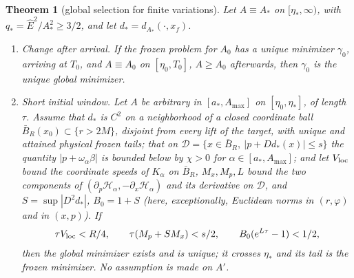 \documentclass[aip,jmp,amsmath,amssymb,reprint]{revtex4-2}
\newcommand{\Ehat}{\hat E}
\theoremstyle{plain}
\newtheorem{theorem}{Theorem}
\theoremstyle{definition}
\begin{document}
\begin{theorem}[global selection for finite variations]\label{thm:tau-eq-select}
Let $A\equiv A_*$ on $[\eta_*,\infty)$, with $q_*=\Ehat^2/A_*^2\ge3/2$, and let $d_*=d_{A_*}(\cdot,x_f)$.
\begin{enumerate}
\item \emph{Change after arrival.} If the frozen problem for $A_0$ has a unique minimizer $\gamma_0$,
  arriving at $T_0$, and $A\equiv A_0$ on $[\eta_0,T_0]$, $A\ge A_0$ afterwards, then $\gamma_0$ is the unique
  global minimizer.
\item \emph{Short initial window.} Let $A$ be arbitrary in $[a_*,A_{\max}]$ on $[\eta_0,\eta_*]$, of
  length $\tau$. Assume that $d_*$ is $C^2$ on a neighborhood of a closed coordinate ball
  $\bar B_R(x_0)\subset\{r>2M\}$, disjoint from every lift of the target, with unique and attained
  physical frozen tails; that on
  $\mathcal D=\{x\in\bar B_R,\ |p+Dd_*(x)|\le s\}$ the quantity $|p+\omega_\alpha\beta|$ is bounded below by
  $\chi>0$ for $\alpha\in[a_*,A_{\max}]$; and let $V_{\rm loc}$ bound the coordinate speeds of $K_\alpha$ on
  $\bar B_R$, $M_x,M_p,L$ bound the two components of $(\partial_p\mathcal H_\alpha,-\partial_x\mathcal H_\alpha)$ and
  its derivative on $\mathcal D$, and $S=\sup|D^2d_*|$, $B_0=1+S$ (here, exceptionally, Euclidean norms
  in $(r,\varphi)$ and in $(x,p)$).
  If
  \[
    \tau V_{\rm loc}<R/4,\qquad \tau(M_p+SM_x)<s/2,\qquad B_0(e^{L\tau}-1)<1/2,
  \]
  then the global minimizer exists and is unique; it crosses $\eta_*$ and its tail is the frozen
  minimizer. No assumption is made on $A'$.
\end{enumerate}
\end{theorem}
\end{document}
